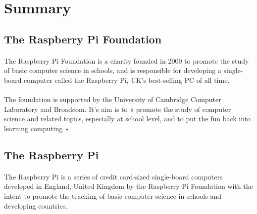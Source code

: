 \documentclass[10pt,a4paper]{article}
\begin{document}

\newpage


\section{Summary}

\subsection{The Raspberry Pi Foundation}

\paragraph{}The Raspberry Pi Foundation is a charity founded in 2009 to promote the study of basic computer science in schools, and is responsible for developing a single-board computer called the Raspberry Pi, UK's best-selling PC of all time.

\paragraph{}The foundation is supported by the University of Cambridge Computer Laboratory and Broadcom. It's aim is to « promote the study of computer science and related topics, especially at school level, and to put the fun back into learning computing ».

\subsection{The Raspberry Pi}

\paragraph{}The Raspberry Pi is a series of credit card-sized single-board computers developed in England, United Kingdom by the Raspberry Pi Foundation with the intent to promote the teaching of basic computer science in schools and developing countries.
\end{document}
